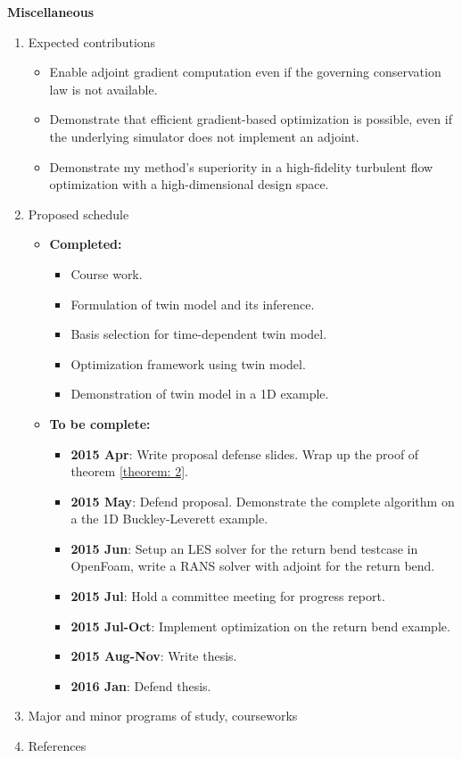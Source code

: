 \documentclass[a4paper,onecolumn]{article}
\theoremstyle{remark}
\begin{document}
\newpage
\textbf{Miscellaneous}
\begin{enumerate}
    \item Expected contributions
          \begin{itemize}
              \item Enable adjoint gradient computation even if the governing conservation law is not available.
              \item Demonstrate that efficient gradient-based optimization is possible, even if the underlying simulator does not
                    implement an adjoint.
              \item Demonstrate my method's superiority in a high-fidelity turbulent flow optimization with a high-dimensional design space.
          \end{itemize}
    \item Proposed schedule
          \begin{itemize}
           \item   \textbf{Completed:}
                   \begin{itemize}
                       \item Course work.
                       \item Formulation of twin model and its inference.
                       \item Basis selection for time-dependent twin model.
                       \item Optimization framework using twin model.
                       \item Demonstration of twin model in a 1D example.
                   \end{itemize}
           \item   \textbf{To be complete:}
                   \begin{itemize}
                       \item \textbf{2015 Apr}: Write proposal defense slides. Wrap up the proof of theorem \ref{theorem: 2}.
                       \item \textbf{2015 May}: Defend proposal. Demonstrate the complete algorithm on a the 1D Buckley-Leverett example.
                       \item \textbf{2015 Jun}: Setup an LES solver for the return bend testcase in OpenFoam, write a RANS solver with adjoint for the return bend.
                       \item \textbf{2015 Jul}: Hold a committee meeting for progress report.
                       \item \textbf{2015 Jul-Oct}: Implement optimization on the return bend example.
                       \item \textbf{2015 Aug-Nov}: Write thesis.
                       \item \textbf{2016 Jan}: Defend thesis.
                   \end{itemize}
          \end{itemize} 
    \item Major and minor programs of study, courseworks
    \item References
\end{enumerate}
\end{document}

